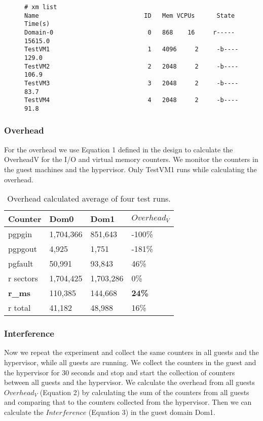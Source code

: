 \begin{figure}[h]
\begin{Verbatim}
# xm list
Name                             ID   Mem VCPUs      State   Time(s)
Domain-0                          0   868    16     r-----  15615.0
TestVM1                           1   4096     2     -b----    129.0
TestVM2                           2   2048     2     -b----    106.9
TestVM3                           3   2048     2     -b----     83.7
TestVM4                           4   2048     2     -b----     91.8
\end{Verbatim}
\end{figure}

\subsubsection{Overhead}
For the overhead we use Equation 1 defined in the design to calculate the OverheadV for the I/O and virtual
memory counters. We monitor the counters in the guest machines and the hypervisor. Only TestVM1 runs
while calculating the overhead.

\begin{table}[h]
\begin{tabular}{ l l l p{5cm} }
  Counter & Dom0 & Dom1 & $Overhead_V$ \\
  \hline
pgpgin    & 1,704,366 & 851,643 & -100\% \\
pgpgout   & 4,925     & 1,751   & -181\% \\
pgfault   & 50,991    & 93,843  & 46\%   \\
r sectors & 1,704,425 & 1,703,286 & 0\%  \\
\textbf{r\_ms} & 110,385 & 144,668 & \textbf{24\%} \\
r total   & 41,182 & 48,988 & 16\% \\
  \hline
\end{tabular}
\caption{Overhead calculated average of four test runs.}
\label{fig:OverheadMed}
\end{table}

\subsubsection{Interference}
Now we repeat the experiment and collect the same counters in all guests and the hypervisor, while all guests are running. 
We collect the counters in the guest and the hypervisor for 30 seconds and stop and start the collection of counters between all guests and the hypervisor. 
We calculate the overhead from all guests $Overhead_V$ (Equation 2) by calculating the sum of the counters from all guests and comparing that to the counters collected from the hypervisor. 
Then we can calculate the $Interference$ (Equation 3) in the guest domain Dom1.

